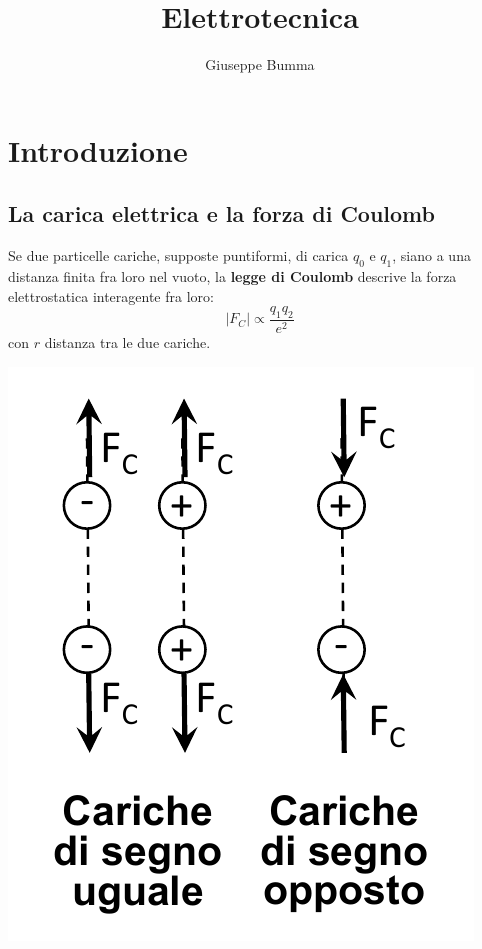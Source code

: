 \documentclass{article}
\title{Elettrotecnica}
\author{Giuseppe Bumma}
\begin{document}
\newcommand{\R}{\mathbb{R}}
\newcommand{\Varepsilon}{\mathcal{E}}
\newcommand{\rad}{\text{rad}}
\newcommand{\bb}[1]{\mathbb{#1}}
\newcommand{\cc}[1]{\mathcal{#1}}
\newcommand{ \lognormal }{\text{Lognormal} }
\newcommand{\T}[1]{\text{#1}}
\newcommand*\circled[1]{\tikz[baseline=(char.base)]{%
            \node[shape=circle,draw,inner sep=2pt] (char) {#1};}}


\tableofcontents

\maketitle

\section{Introduzione}

\subsection{La carica elettrica e la forza di Coulomb}
Se due particelle cariche, supposte puntiformi, di carica $q_0$ e $q_1$, siano a una distanza finita fra loro nel vuoto, la \textbf{legge di Coulomb} descrive la forza elettrostatica interagente fra loro:
\[
    |F_C| \propto \frac{q_1q_2}{e^2}
\]
con $r$ distanza tra le due cariche.

\begin{center}
    \includegraphics[scale=0.3]{Image/Forza di Coulomb.png}
\end{center}
\end{document}
